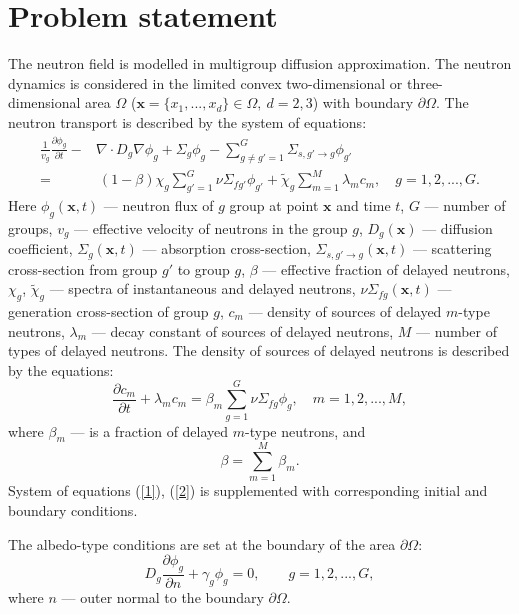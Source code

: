 \documentclass[authoryear]{elsarticle}
\begin{document}
\section{Problem statement}

The neutron field is modelled in multigroup diffusion approximation. The neutron dynamics is considered in the limited convex two-dimensional or three-dimensional area  $\Omega$ ($\bm x = \{x_1, ..., x_d\} \in \Omega, \ d = 2,3$) with boundary $\partial \Omega$. The neutron transport is described by the system of equations:
\begin{equation}\label{1}
\begin{split}
 \frac{1}{v_g} \frac{\partial \phi_g}{\partial t} - & \nabla \cdot D_g \nabla \phi_g + \Sigma_g \phi_g 
 - \sum_{g\neq g'=1}^{G} \Sigma_{s,g'\rightarrow g} \phi_{g'} \\
 =  & \ (1-\beta) \chi_g \sum_{g'=1}^{G} \nu \Sigma_{fg'} \phi_{g'} + \widetilde{\chi}_g \sum_{m=1}^{M} \lambda_m c_m , \quad 
 g = 1,2, ..., G .
\end{split}
\end{equation} 
Here $\phi_g(\bm x,t)$ --- neutron flux of $g$ group at point $\bm x$ and time $t$,
$G$ --- number of groups,
$v_g$ --- effective velocity of neutrons in the group $g$,
$D_g(\bm x)$ --- diffusion coefficient, $\Sigma_g(\bm x,t)$ --- absorption cross-section,
$\Sigma_{s,g'\rightarrow g}(\bm x,t)$ --- scattering cross-section from group $g'$ to group $g$,
$\beta$ --- effective fraction of delayed neutrons, $\chi_g$, $\widetilde{\chi}_g$  --- spectra of instantaneous and delayed neutrons, 
$\nu\Sigma_{fg}(\bm x,t)$ --- generation cross-section of group $g$,
$c_m$ --- density of sources of delayed  $m$-type neutrons,  $\lambda_m$ --- decay constant of sources of delayed neutrons,
$M$ --- number of types of delayed neutrons.
The density of sources of delayed neutrons is described by the equations:
\begin{equation}\label{2}
 \frac{\partial c_m}{\partial t} + \lambda_m c_m = \beta_m \sum_{g=1}^{G} \nu \Sigma_{fg} \phi_g ,
 \quad m = 1,2, ..., M , 
\end{equation} 
where $\beta_m$ --- is a fraction of delayed $m$-type neutrons, and
\[
 \beta = \sum_{m=1}^{M} \beta_m .
\] 
System of equations (\ref{1}), (\ref{2}) is supplemented with corresponding initial and boundary conditions.

The albedo-type conditions are set at the boundary of the area $\partial \Omega$:
\begin{equation}\label{3}
 D_g\frac{\partial \phi_g}{\partial n} + \gamma_g \phi_g = 0, \quad 
 \quad g = 1,2, ..., G ,
\end{equation}
where $n$ --- outer normal to the boundary $\partial \Omega$.
\end{document}
